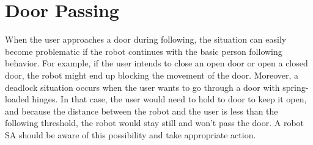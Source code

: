 %
%
%
%

\section{Door Passing}
\label{sec:following_door_passing}

When the user approaches a door during following, the situation can easily become problematic if the robot continues with the basic person following behavior. For example, if the user intends to close an open door or open a closed door, the robot might end up blocking the movement of the door. Moreover, a deadlock situation occurs when the user wants to go through a door with spring-loaded hinges. In that case, the user would need to hold to door to keep it open, and because the distance between the robot and the user is less than the following threshold, the robot would stay still and won't pass the door. A robot SA should be aware of this possibility and take appropriate action. 

